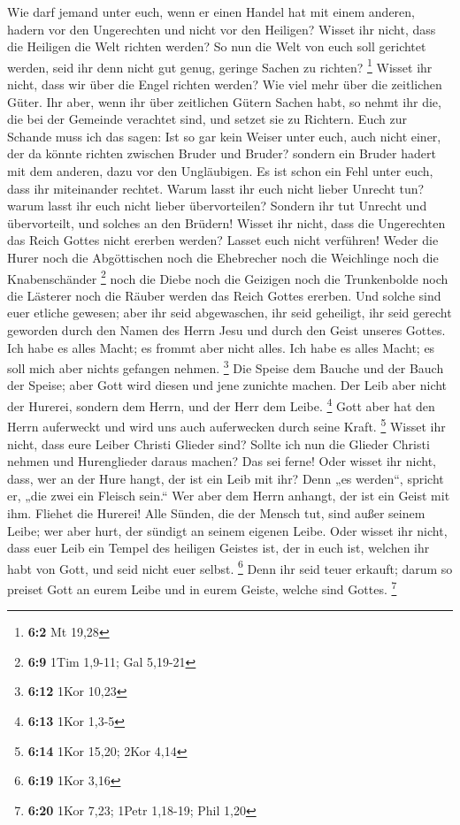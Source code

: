  Wie darf jemand unter euch, wenn er einen Handel hat mit
einem anderen, hadern vor den Ungerechten und nicht vor den Heiligen?
 Wisset ihr nicht, dass die Heiligen die Welt richten
werden? So nun die Welt von euch soll gerichtet werden, seid ihr denn
nicht gut genug, geringe Sachen zu richten? \footnote{\textbf{6:2} Mt
  19,28}  Wisset ihr nicht, dass wir über die Engel
richten werden? Wie viel mehr über die zeitlichen Güter. 
Ihr aber, wenn ihr über zeitlichen Gütern Sachen habt, so nehmt ihr die,
die bei der Gemeinde verachtet sind, und setzet sie zu Richtern.
 Euch zur Schande muss ich das sagen: Ist so gar kein
Weiser unter euch, auch nicht einer, der da könnte richten zwischen
Bruder und Bruder?  sondern ein Bruder hadert mit dem
anderen, dazu vor den Ungläubigen.  Es ist schon ein Fehl
unter euch, dass ihr miteinander rechtet. Warum lasst ihr euch nicht
lieber Unrecht tun? warum lasst ihr euch nicht lieber übervorteilen?
 Sondern ihr tut Unrecht und übervorteilt, und solches an
den Brüdern!  Wisset ihr nicht, dass die Ungerechten das
Reich Gottes nicht ererben werden? Lasset euch nicht verführen! Weder
die Hurer noch die Abgöttischen noch die Ehebrecher noch die Weichlinge
noch die Knabenschänder \footnote{\textbf{6:9} 1Tim 1,9-11; Gal 5,19-21}
 noch die Diebe noch die Geizigen noch die Trunkenbolde
noch die Lästerer noch die Räuber werden das Reich Gottes ererben.
 Und solche sind euer etliche gewesen; aber ihr seid
abgewaschen, ihr seid geheiligt, ihr seid gerecht geworden durch den
Namen des Herrn Jesu und durch den Geist unseres Gottes. 
Ich habe es alles Macht; es frommt aber nicht alles. Ich habe es alles
Macht; es soll mich aber nichts gefangen nehmen. \footnote{\textbf{6:12}
  1Kor 10,23}  Die Speise dem Bauche und der Bauch der
Speise; aber Gott wird diesen und jene zunichte machen. Der Leib aber
nicht der Hurerei, sondern dem Herrn, und der Herr dem Leibe.
\footnote{\textbf{6:13} 1Kor 1,3-5}  Gott aber hat den
Herrn auferweckt und wird uns auch auferwecken durch seine Kraft.
\footnote{\textbf{6:14} 1Kor 15,20; 2Kor 4,14}  Wisset
ihr nicht, dass eure Leiber Christi Glieder sind? Sollte ich nun die
Glieder Christi nehmen und Hurenglieder daraus machen? Das sei ferne!
 Oder wisset ihr nicht, dass, wer an der Hure hangt, der
ist ein Leib mit ihr? Denn „es werden``, spricht er, „die zwei ein
Fleisch sein.``  Wer aber dem Herrn anhangt, der ist ein
Geist mit ihm.  Fliehet die Hurerei! Alle Sünden, die der
Mensch tut, sind außer seinem Leibe; wer aber hurt, der sündigt an
seinem eigenen Leibe.  Oder wisset ihr nicht, dass euer
Leib ein Tempel des heiligen Geistes ist, der in euch ist, welchen ihr
habt von Gott, und seid nicht euer selbst. \footnote{\textbf{6:19} 1Kor
  3,16}  Denn ihr seid teuer erkauft; darum so preiset
Gott an eurem Leibe und in eurem Geiste, welche sind Gottes. \footnote{\textbf{6:20}
  1Kor 7,23; 1Petr 1,18-19; Phil 1,20}

